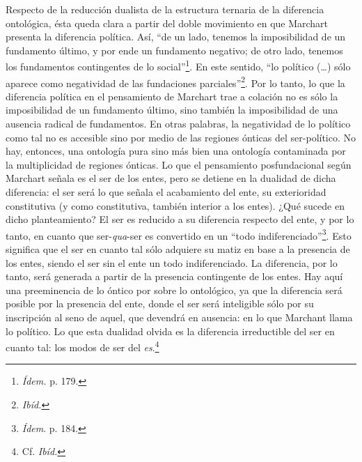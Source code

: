 Respecto de la reducción dualista de la estructura ternaria de la diferencia ontológica, ésta queda clara a partir del doble movimiento en que Marchart presenta la diferencia política. Así, \enquote{de un lado, tenemos la imposibilidad de un fundamento último, y por ende un fundamento negativo; de otro lado, tenemos los fundamentos contingentes de lo social}\footnote{\emph{Ídem.} p. 179.}. En este sentido, \enquote{lo político (\dots) sólo aparece como negatividad de las fundaciones parciales}\footnote{\emph{Ibíd.}}. Por lo tanto, lo que la diferencia política en el pensamiento de Marchart trae a colación no es sólo la imposibilidad de un fundamento último, sino también la imposibilidad de una ausencia radical de fundamentos. En otras palabras, la negatividad de lo político como tal no es accesible sino por medio de las regiones ónticas del ser-político. No hay, entonces, una ontología pura sino más bien una ontología contaminada por la multiplicidad de regiones ónticas. Lo que el pensamiento posfundacional según Marchart señala es el ser de los entes, pero se detiene en la dualidad de dicha diferencia: el ser será lo que señala el acabamiento del ente, su exterioridad constitutiva (y como constitutiva, también interior a los entes). ¿Qué sucede en dicho planteamiento? El ser es reducido a su diferencia respecto del ente, y por lo tanto, en cuanto que ser-\emph{qua}-ser es convertido en un \enquote{todo indiferenciado}\footnote{\emph{Ídem}. p. 184.}. Esto significa que el ser en cuanto tal sólo adquiere su matiz  en base a la presencia de los entes, siendo el ser sin el ente un todo indiferenciado. La diferencia, por lo tanto, será generada a partir de la presencia contingente de los entes. Hay aquí una preeminencia de lo óntico por sobre lo ontológico, ya que la diferencia será posible por la presencia del ente, donde el ser será inteligible sólo por su inscripción al seno de aquel, que devendrá en ausencia: en lo que Marchant llama lo político. Lo que esta dualidad olvida es la diferencia irreductible del ser en cuanto tal: los modos de ser del \emph{es}.\footnote{Cf. \emph{Ibíd.}}

